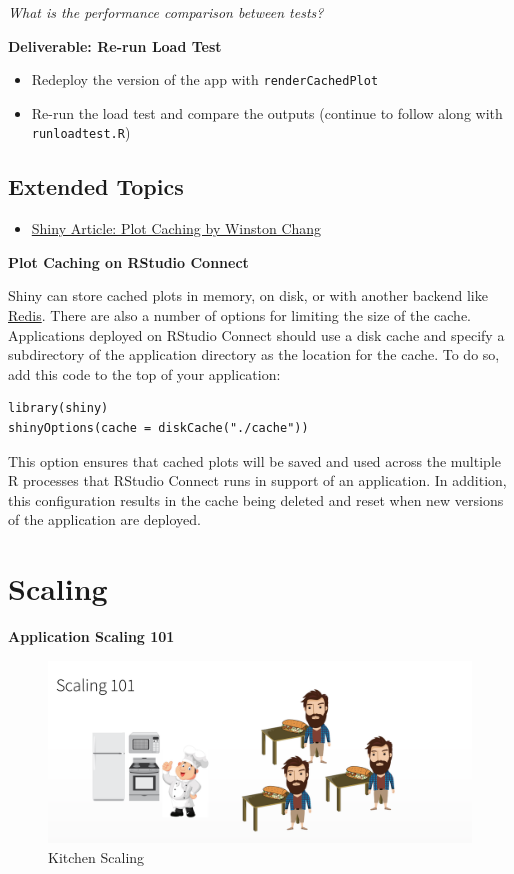 \documentclass[]{book}
\providecommand{\tightlist}{%
  \setlength{\itemsep}{0pt}\setlength{\parskip}{0pt}}
\theoremstyle{definition}
\theoremstyle{definition}
\theoremstyle{definition}
\theoremstyle{remark}
\begin{document}
\emph{What is the performance comparison between tests?}

\textbf{Deliverable: Re-run Load Test}

\begin{itemize}
\tightlist
\item
  Redeploy the version of the app with \texttt{renderCachedPlot}
\item
  Re-run the load test and compare the outputs (continue to follow along
  with \texttt{runloadtest.R})
\end{itemize}

\hypertarget{extended-topics}{%
\section{Extended Topics}\label{extended-topics}}

\begin{itemize}
\tightlist
\item
  \href{http://shiny.rstudio.com/articles/plot-caching.html}{Shiny
  Article: Plot Caching by Winston Chang}
\end{itemize}

\textbf{Plot Caching on RStudio Connect}

Shiny can store cached plots in memory, on disk, or with another backend
like \href{https://redis.io/}{Redis}. There are also a number of options
for limiting the size of the cache. Applications deployed on RStudio
Connect should use a disk cache and specify a subdirectory of the
application directory as the location for the cache. To do so, add this
code to the top of your application:

\begin{verbatim}
library(shiny)
shinyOptions(cache = diskCache("./cache"))
\end{verbatim}

This option ensures that cached plots will be saved and used across the
multiple R processes that RStudio Connect runs in support of an
application. In addition, this configuration results in the cache being
deleted and reset when new versions of the application are deployed.

\hypertarget{scaling}{%
\chapter{Scaling}\label{scaling}}

\textbf{Application Scaling 101}

\begin{figure}
\centering
\includegraphics{imgs/scaling/kitchen-scaling.png}
\caption{Kitchen Scaling}
\end{figure}
\end{document}
